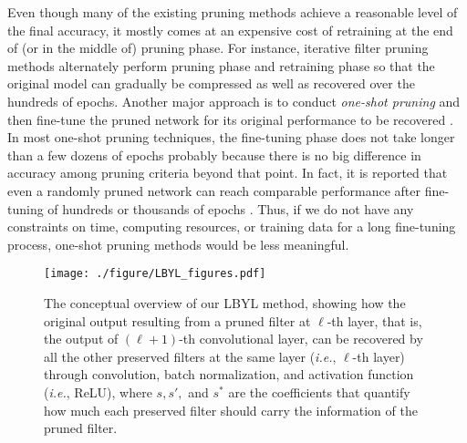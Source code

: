 
Even though many of the existing pruning methods achieve a reasonable level of the final accuracy, it mostly comes at an expensive cost of retraining at the end of (or in the middle of) pruning phase. For instance, iterative filter pruning methods \cite{Soft,FPGM,Dynamic} alternately perform pruning phase and retraining phase so that the original model can gradually be compressed as well as recovered over the hundreds of epochs. Another major approach is to conduct \textit{one-shot pruning} and then fine-tune the pruned network for its original performance to be recovered \cite{EagleEye,CURL,Importance,NISP,DCP}. In most one-shot pruning techniques, the fine-tuning phase does not take longer than a few dozens of epochs probably because there is no big difference in accuracy among pruning criteria beyond that point. In fact, it is reported that even a randomly pruned network can reach comparable performance after fine-tuning of hundreds or thousands of epochs \cite{Rethinking}. Thus, if we do not have any constraints on time, computing resources, or training data for a long fine-tuning process, one-shot pruning methods would be less meaningful.


\begin{figure*}[t!]
   \centering 
    \texttt{[image: ./figure/LBYL\_figures.pdf]}
   \caption{The conceptual overview of our LBYL method, showing how the original output resulting from a pruned filter at $\ell$-th layer, that is, the output of $(\ell+1)$-th convolutional layer, can be recovered by all the other preserved filters at the same layer (\textit{i.e.}, $\ell$-th layer) through convolution, batch normalization, and activation function (\textit{i.e.}, ReLU), where $s, s',$ and $s^*$ are the coefficients that quantify how much each preserved filter should carry the information of the pruned filter.}
   \label{fig:framework}
\end{figure*}


